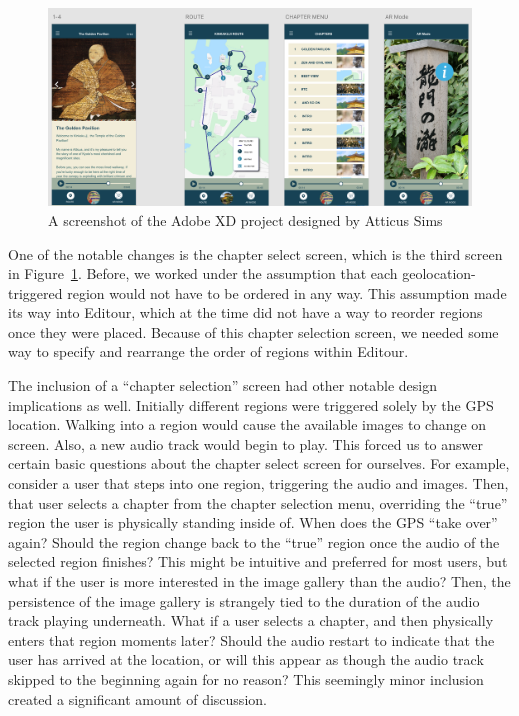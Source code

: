 \documentclass[a4paper, 10pt, american, titlepage]{article}
\begin{document}
\begin{figure}[h]
	\centering
	\includegraphics[width=1\textwidth]{adobe-xd-design.png}
	\caption[A screenshot of the Adobe XD project designed by Atticus Sims]
    {A screenshot of the Adobe XD project designed by Atticus Sims}
	\label{fig:adobeXdDesign}
\end{figure}

One of the notable changes is the chapter select screen, which is the third
screen in Figure~\ref{fig:adobeXdDesign}. Before, we worked under the assumption
that each geolocation-triggered region would not have to be ordered in any way.
This assumption made its way into Editour, which at the time did not have a way
to reorder regions once they were placed. Because of this chapter selection
screen, we needed some way to specify and rearrange the order of regions within
Editour.

The inclusion of a ``chapter selection'' screen had other notable design
implications as well. Initially different regions were triggered solely by the
GPS location. Walking into a region would cause the available images to change
on screen. Also, a new audio track would begin to play. This forced us to answer
certain basic questions about the chapter select screen for ourselves. For
example, consider a user that steps into one region, triggering the audio and
images. Then, that user selects a chapter from the chapter selection menu,
overriding the ``true'' region the user is physically standing inside of. When
does the GPS ``take over'' again? Should the region change back to the ``true''
region once the audio of the selected region finishes? This might be intuitive
and preferred for most users, but what if the user is more interested in the
image gallery than the audio? Then, the persistence of the image gallery is
strangely tied to the duration of the audio track playing underneath. What if a
user selects a chapter, and then physically enters that region moments later?
Should the audio restart to indicate that the user has arrived at the location,
or will this appear as though the audio track skipped to the beginning again for
no reason? This seemingly minor inclusion created a significant amount of
discussion.
\end{document}
